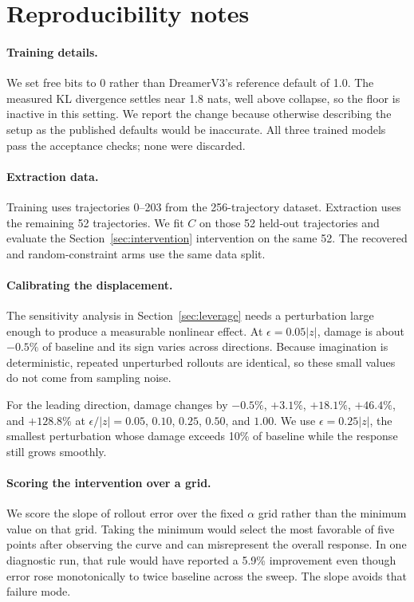 \section{Reproducibility notes}
\label{sec:repro}

\paragraph{Training details.} We set free bits to 0 rather than DreamerV3's reference default of 1.0.
The measured KL divergence settles near 1.8 nats, well above collapse, so the floor is inactive in
this setting. We report the change because otherwise describing the setup as the published defaults
would be inaccurate. All three trained models pass the acceptance checks; none were discarded.

\paragraph{Extraction data.} Training uses trajectories 0--203 from the 256-trajectory dataset.
Extraction uses the remaining 52 trajectories. We fit $C$ on those 52 held-out trajectories and
evaluate the Section~\ref{sec:intervention} intervention on the same 52. The recovered and
random-constraint arms use the same data split.

\paragraph{Calibrating the displacement.} The sensitivity analysis in Section~\ref{sec:leverage}
needs a perturbation large enough to produce a measurable nonlinear effect. At $\epsilon = 0.05|z|$,
damage is about $-0.5\%$ of baseline and its sign varies across directions. Because imagination is
deterministic, repeated unperturbed rollouts are identical, so these small values do not come from
sampling noise.

For the leading direction, damage changes by $-0.5\%$, $+3.1\%$, $+18.1\%$, $+46.4\%$, and
$+128.8\%$ at $\epsilon/|z| = 0.05$, $0.10$, $0.25$, $0.50$, and $1.00$. We use
$\epsilon = 0.25|z|$, the smallest perturbation whose damage exceeds 10\% of baseline while the
response still grows smoothly.

\paragraph{Scoring the intervention over a grid.} We score the slope of rollout error over the fixed
$\alpha$ grid rather than the minimum value on that grid. Taking the minimum would select the most
favorable of five points after observing the curve and can misrepresent the overall response. In one
diagnostic run, that rule would have reported a 5.9\% improvement even though error rose
monotonically to twice baseline across the sweep. The slope avoids that failure mode.

